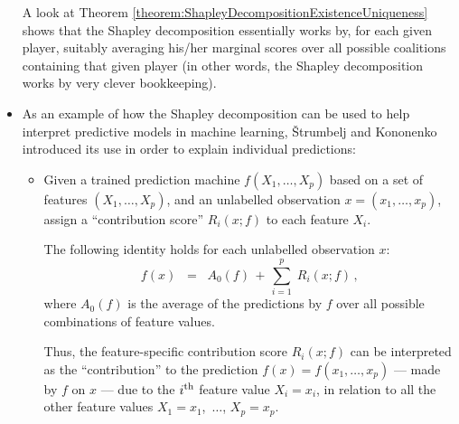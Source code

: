 \begin{itemize}
	A look at Theorem \ref{theorem:ShapleyDecompositionExistenceUniqueness} shows
	that the Shapley decomposition essentially works by,
	for each given player, {\color{red}suitably averaging} his/her {\color{red}marginal scores}
	over all possible coalitions containing that given player
	(in other words, the Shapley decomposition works by very clever bookkeeping).

\item
	As an example of how the Shapley decomposition can be used
	to help interpret predictive models in machine learning,
	\v{S}trumbelj and Kononenko \cite{Strumbelj2010}
	introduced its use in order to {\color{red}explain individual predictions}:
	\begin{itemize}
	\item
		Given a trained prediction machine $f(X_{1},\ldots,X_{p})$
		based on a set of features $(X_{1},\ldots,X_{p})$, and
		an unlabelled observation $x = (x_{1},\ldots,x_{p})$,
		assign a ``contribution score'' $R_{i}(x;f)$ to each feature $X_{i}$.

		The following identity holds for each unlabelled observation $x$:
		\begin{equation*}
		f(x)
		\;\; = \;\;
			A_{0}(f)
			\, + \,
			\overset{p}{\underset{i=1}{\sum}}\;
			R_{i}(x;f)\,,
		\end{equation*}
		where $A_{0}(f)$ is the average of the predictions by $f$
		over all possible combinations of feature values.

		Thus, the feature-specific contribution score $R_{i}(x;f)$ can be interpreted
		as the ``{\color{red}contribution}'' %
		to the prediction $f(x) = f(x_{1},\ldots,x_{p})$ --- made by $f$ on $x$ ---
		due to the $i^{\textnormal{th}}$ feature value $X_{i} = x_{i}$,
		in relation to all the other feature values
		$X_{1} = x_{1}$, \,$\ldots$\;, $X_{p} = x_{p}$.


\end{itemize}
\end{itemize}
